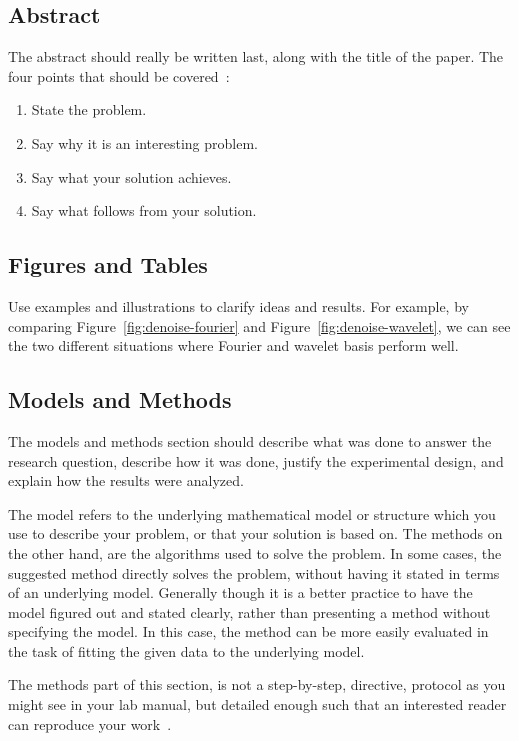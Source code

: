 \documentclass[10pt,conference,compsocconf]{IEEEtran}
\begin{document}
\subsection{Abstract}
The abstract should really be written last, along with the title of
the paper. The four points that should be covered~\cite{jones08}:
\begin{enumerate}
\item State the problem.
\item Say why it is an interesting problem.
\item Say what your solution achieves.
\item Say what follows from your solution.
\end{enumerate}

\subsection{Figures and Tables}



Use examples and illustrations to clarify ideas and results. For
example, by comparing Figure~\ref{fig:denoise-fourier} and
Figure~\ref{fig:denoise-wavelet}, we can see the two different
situations where Fourier and wavelet basis perform well. 

\subsection{Models and Methods}
The models and methods
section should describe what was
done to answer the research question, describe how it was done,
justify the experimental design, and
explain how the results were analyzed.

The model refers to the underlying mathematical model or structure which 
you use to describe your problem, or that your solution is based on. 
The methods on the other hand, are the algorithms used to solve the problem. 
In some cases, the suggested method directly solves the problem, without having it 
stated in terms of an underlying model. Generally though it is a better practice to have 
the model figured out and stated clearly, rather than presenting a method without specifying 
the model. In this case, the method can be more easily evaluated in the task of fitting 
the given data to the underlying model.

The methods part of this section, is not a step-by-step, directive,
protocol as you might see in your lab manual, but detailed enough such
that an interested reader can reproduce your
work~\cite{anderson04,wavelab}.
\end{document}
